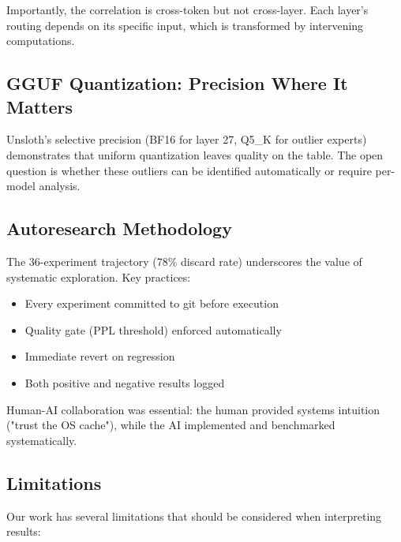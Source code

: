 \documentclass[11pt,twocolumn]{article}
\begin{document}
Importantly, the correlation is cross-token but not cross-layer. Each layer's routing depends on its specific input, which is transformed by intervening computations.

\subsection{GGUF Quantization: Precision Where It Matters}

Unsloth's selective precision (BF16 for layer 27, Q5\_K for outlier experts) demonstrates that uniform quantization leaves quality on the table. The open question is whether these outliers can be identified automatically or require per-model analysis.

\subsection{Autoresearch Methodology}

The 36-experiment trajectory (78\% discard rate) underscores the value of systematic exploration. Key practices:
\begin{itemize}
    \item Every experiment committed to git before execution
    \item Quality gate (PPL threshold) enforced automatically
    \item Immediate revert on regression
    \item Both positive and negative results logged
\end{itemize}

Human-AI collaboration was essential: the human provided systems intuition ("trust the OS cache"), while the AI implemented and benchmarked systematically.

\subsection{Limitations}

Our work has several limitations that should be considered when interpreting results:
\end{document}
